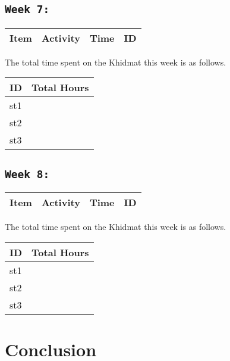 \documentclass[11pt]{article}
\begin{document}
\subsection{\texttt{Week 7: }}
\begin{center}
\begin{tabular}{|l|l|l|l|}
  \hline
  \textbf{Item} 	& \textbf{Activity} & \textbf{Time} & \textbf{ID} \\\hline
  
\end{tabular}
    
\end{center}
The total time spent on the Khidmat this week is as follows.    
\begin{center}
    
\begin{tabular}{|l|l|}
  \hline
  \textbf{ID} & \textbf{Total Hours}\\\hline
  st1 & \\\hline
  st2 & \\\hline
  st3 & \\\hline
\end{tabular}
\end{center}
\newpage
\subsection{\texttt{Week 8: }}
\begin{center}
\begin{tabular}{|l|l|l|l|}
  \hline
  \textbf{Item} 	& \textbf{Activity} & \textbf{Time} & \textbf{ID} \\\hline
  
\end{tabular}
    
\end{center}
The total time spent on the Khidmat this week is as follows.    
\begin{center}
    
\begin{tabular}{|l|l|}
  \hline
  \textbf{ID} & \textbf{Total Hours}\\\hline
  st1 & \\\hline
  st2 & \\\hline
  st3 & \\\hline
\end{tabular}
\end{center}
\newpage
\section{Conclusion}
\newpage
\end{document}
